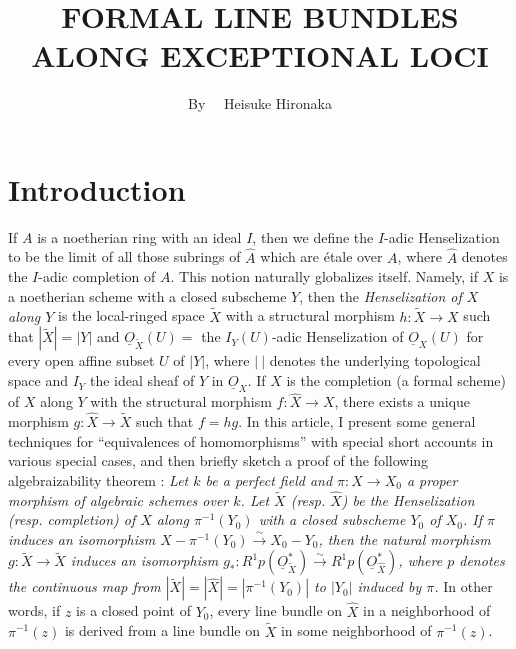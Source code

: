 \title{FORMAL LINE BUNDLES ALONG EXCEPTIONAL LOCI}

\author{By~~ Heisuke Hironaka}

\date{}

\maketitle

\setcounter{pageoriginal}{200}
\section*{Introduction}\pageoriginale

If $A$ is a noetherian ring with an ideal $I$, then we define the $I$-adic Henselization to be the limit of all those subrings of $\widehat{A}$ which are \'etale over $A$, where $\widehat{A}$ denotes the $I$-adic completion of $A$. This notion naturally globalizes itself. Namely, if $X$ is a noetherian scheme with a closed subscheme $Y$, then the {\em Henselization of $X$ along $Y$} is the local-ringed space $\widetilde{X}$ with a structural morphism $h:\widetilde{X}\to X$ such that $|\widetilde{X}|=|Y|$ and $\underline{O}_{\widetilde{X}}(U)=$ the $I_{Y}(U)$-adic Henselization of $\underline{O}_{X}(U)$ for every open affine subset $U$ of $|Y|$, where $|~|$ denotes the underlying topological space and $I_{Y}$ the ideal sheaf of $Y$ in $\underline{O}_{X}$. If $\widehat{X}$ is the completion (a formal scheme) of $X$ along $Y$ with the structural morphism $f:\widehat{X}\to X$, there exists a unique morphism $g:\widehat{X}\to \widetilde{X}$ such that $f=hg$. In this article, I present some general techniques for ``equivalences of homomorphisms'' with special short accounts in various special cases, and then briefly sketch a proof of the following algebraizability theorem : {\em Let $k$ be a perfect field and $\pi:X\to X_{0}$ a proper morphism of algebraic schemes over $k$. Let $\widetilde{X}$ (resp. $\widehat{X}$) be the Henselization (resp. completion) of $X$ along $\pi^{-1}(Y_{0})$ with a closed subscheme $Y_{0}$ of $X_{0}$. If $\pi$ induces an isomorphism $X-\pi^{-1}(Y_{0})\xrightarrow{\sim}X_{0}-Y_{0}$, then the natural morphism $g:\widetilde{X}\to \widetilde{X}$ induces an isomorphism $g_{*}:R^{1}p(\underline{O}_{\widetilde{X}}^{*})\xrightarrow{\sim}R^{1}p(\underline{O}_{\widehat{X}}^{*})$, where $p$ denotes the continuous map from $|\widetilde{X}|=|\widehat{X}|=|\pi^{-1}(Y_{0})|$ to $|Y_{0}|$ induced by $\pi$.} In other words, if $z$ is a closed point of $Y_{0}$, every line bundle on $\widehat{X}$ in a neighborhood of $\pi^{-1}(z)$ is derived from a line bundle on $\widetilde{X}$ in some neighborhood of $\pi^{-1}(z)$.


